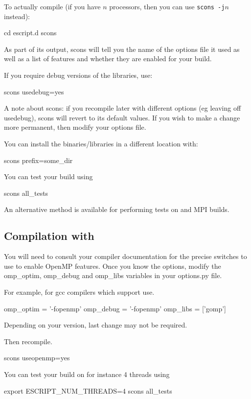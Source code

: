 To actually compile (if you have $n$ processors, then you can use \texttt{scons -j$n$} instead):

\begin{shellCode}
cd escript.d
scons
\end{shellCode}

As part of its output, scons will tell you the name of the options file it used as well as a list of features 
and whether they are enabled for your build.

If you require debug versions of the libraries, use:
\begin{shellCode}
 scons usedebug=yes
\end{shellCode}
A note about scons: if you recompile later with different options (eg leaving off usedebug), scons will revert 
to its default values. If you wish to make a change more permanent, then modify your options file.


You can install the binaries/libraries in a different location with:
\begin{shellCode}
 scons prefix=some_dir
\end{shellCode}

You can test your build using 
\begin{shellCode}
scons all_tests
\end{shellCode}
An alternative method is available for performing tests on \openmp and MPI builds.

\subsection{Compilation with \openmp}
You will need to consult your compiler documentation for the precise switches to use to enable OpenMP features.
Once you know the options, modify the omp_optim, omp_debug and omp_libs variables in your options.py file.

For example, for gcc compilers which support \openmp use.
\begin{shellCode}
omp_optim		= '-fopenmp'
omp_debug		= '-fopenmp'
omp_libs		= ['gomp']
\end{shellCode}
Depending on your version, last change may not be required.

Then recompile.
\begin{shellCode}
 scons useopenmp=yes
\end{shellCode}

You can test your build on for instance 4 threads using 
\begin{shellCode}
export ESCRIPT_NUM_THREADS=4
scons all_tests
\end{shellCode}

